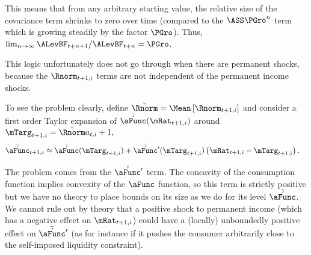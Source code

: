 \documentclass[\econtexRoot/BufferStockTheory]{subfiles}
\begin{document}
This means that from any arbitrary starting value, the relative
size of the covariance term shrinks to zero over time (compared
to the $\ASS \PGro^{n}$ term which is growing steadily
by the factor $\PGro$).  Thus, $\lim_{n \rightarrow \infty} \ALevBF_{t+n+1}/\ALevBF_{t+n} = \PGro$.

This logic unfortunately does not go through when there are permanent
shocks, because the $\Rnorm _{t+1,i}$ terms are not independent
of the permanent income shocks.

To see the problem clearly, define $\breve{\Rnorm }=\Mean\left[\Rnorm _{t+1,i}\right]$ and consider a first order Taylor expansion of $\AMPS(\mRat_{t+1,i})$ around $\mTarg_{t+1,i}=\breve{\Rnorm } a_{t,i}+1,$
\begin{align*}
  \AMPS_{t+1,i} & \approx 
  \AMPS(\mTarg_{t+1,i})+\AMPS^{\prime}(\mTarg_{t+1,i})\left(\mRat_{t+1,i}-\mTarg_{t+1,i}\right)
 \nonumber.
\end{align*}


The problem comes from the $\AMPS^{\prime}$ term.  The
concavity of the consumption function implies convexity of the
$\aFunc$ function, so this term is strictly positive but we have no
theory to place bounds on its size as we do for its level $\AMPS$.
We cannot rule out by theory that a positive shock to permanent income (which has a
negative effect on $\mRat_{t+1,i}$) could have a (locally) unboundedly positive
effect on $\AMPS^{\prime}$ (as for instance if it pushes the
consumer arbitrarily close to the self-imposed liquidity constraint).
\end{document}
